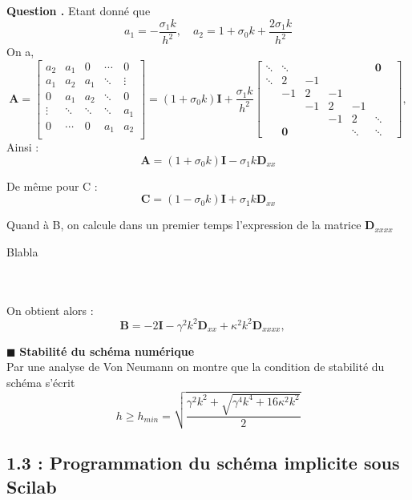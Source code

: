 \documentclass[a4,12pt]{article}
\newcommand{\A}{\mathbf{A}}
\newcommand{\B}{\mathbf{B}}
\newcommand{\C}{\mathbf{C}}
\newcommand{\D}{\mathbf{D}}
\newcounter{Nbquestion}
\newcommand*\question{%
\stepcounter{Nbquestion}%
\textbf{Question \theNbquestion. }}
\begin{document}
  \question Etant donné que 
  \[
    a_1=-\frac{\sigma_1 k}{h^2},\quad a_2=1+\sigma_0 k+\frac{2\sigma_1 k}{h^2}
  \]
  On a,
  \[
    \A=
    \begin{bmatrix} 
      a_2 & a_1 & 0 & \cdots & 0 \\ 
      a_1 & a_2 & a_1 & \ddots & \vdots \\ 
      0 & a_1 & a_2 & \ddots  & 0 \\ 
      \vdots & \ddots & \ddots & \ddots  & a_1 \\ 
      0 & \cdots & 0 & a_1 & a_2  \\
    \end{bmatrix} =
    (1+\sigma_0 k)\mathbf{I} + \frac{\sigma_1 k}{h^2}
    \begin{bmatrix}
      \ddots & \ddots & & & & \mathbf{0}  & \\
      \ddots & 2 & -1 & & & & \\ 
      & -1 & 2 & -1 & & & \\ 
      & & -1 & 2 & -1 & & \\ 
      & & & -1 & 2 & \ddots \\ 
      & \mathbf{0} & & & \ddots & \ddots
    \end{bmatrix},
  \]
  Ainsi : \begin{equation}\A=(1+\sigma_0 k)\mathbf{I}-\sigma_1 k \D_{xx}\end{equation}
  
  De même pour C :  \begin{equation}\C=(1-\sigma_0 k)\mathbf{I}+\sigma_1 k \D_{xx}\end{equation}

  Quand à B, on calcule dans un premier temps l'expression de la matrice $\D_{xxxx}$

  Blabla

  ~\\\\
  On obtient alors :
 $$ \B=-2\mathbf{I}-\gamma^2 k^2 \D_{xx}+\kappa^2 k^2\D_{xxxx}, \quad $$


  \hspace{0.5cm} $\blacksquare$ \textbf{Stabilité du schéma numérique} \\

  Par une analyse de Von Neumann on montre que la condition de stabilité du schéma s'écrit 
  \[
    h\geqslant h_{min}=\sqrt{\frac{\gamma^2k^2+\sqrt{\gamma^4 k^4+16\kappa^2 k^2}}{2}}
  \]

  \subsection*{1.3 : Programmation du schéma implicite sous Scilab}
\end{document}
